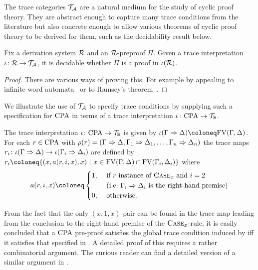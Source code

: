 The trace categories $\mathcal{T}_{\mathcal{A}}$ are a natural medium for the study of cyclic
proof theory. They are abstract enough to capture many trace conditions from the
literature but also concrete enough to allow various theorems of cyclic proof
theory to be derived for them, such as the decidability result below.

\begin{proposition}\label{lem:tc-dec}
  Fix a derivation system $\mathcal{R}$ and an $\mathcal{R}$-preproof $\Pi$. Given a trace
  interpretation $\iota \colon \mathcal{R} \to \mathcal{T}_{\mathcal{A}}$, it is decidable whether $\Pi$ is a
  proof in $\iota(\mathcal{R})$.
\end{proposition}
\begin{proof}
  There are various ways of proving this. For example by appealing to infinite
  word automata~\cite[Theorem 4.4]{wehrAbstractFrameworkAnalysis2021} or to
  Ramsey's theorem~\cite[Theorem 3]{afshariAbstractCyclicProofs2022}.
\end{proof}


We illustrate the use of $\mathcal{T}_{\mathcal{A}}$ to specify trace conditions by supplying such
a specification for $\mathrm{CPA}$ in
terms of a trace interpretation $\iota : \mathrm{CPA} \to \mathcal{T}_{\mathbb{B}}$.

\begin{definition}\label{def:bb-cpa-tc}
  The trace interpretation $\iota \colon \mathrm{CPA} \to \mathcal{T}_{\mathbb{B}}$ is given by
  \(
  \iota(\Gamma \sdash \Delta) \coloneq \FV(\Gamma, \Delta)\).
  For each $r \in \mathrm{CPA}$ with $\rho(r) = (\Gamma \Rightarrow \Delta, \Gamma_1 \Rightarrow
  \Delta_1, \ldots, \Gamma_n \Rightarrow \Delta_n)$
  the trace maps $r_i \colon \iota(\Gamma \Rightarrow \Delta) \to \iota(\Gamma_i
  \Rightarrow \Delta_i)$ are defined by
  \(
  r_i \coloneq \{(x, a(r, i, x), x) ~|~ x \in \FV(\Gamma, \Delta) \cap \FV(\Gamma_i, \Delta_i) \}
  \) where
  \[
    a(r, i, x) \coloneq
    \begin{cases}
      1, & \text{ if } r \text{ instance of } \RCase_x \text{ and } i = 2 \\
         & \text{ (i.e.\ } \Gamma_i \sdash \Delta_i \text{ is the right-hand premise)} \\
      0, & \text{ otherwise.}
    \end{cases}
  \]
\end{definition}

From the fact that the only $(x, 1, x)$ pair can be found in the trace map
leading from the conclusion to the right-hand premise of the $\textsc{Case}_x$-rule, it
is easily concluded that a $\mathrm{CPA}$ pre-proof satisfies the global trace condition
induced by  iff it satisfies that specified in
. A detailed proof of this requires a rather combinatorial
argument.
The curious reader can find a detailed version of a similar argument in
\parencite[Proposition 2]{afshariAbstractCyclicProofs2022}.

